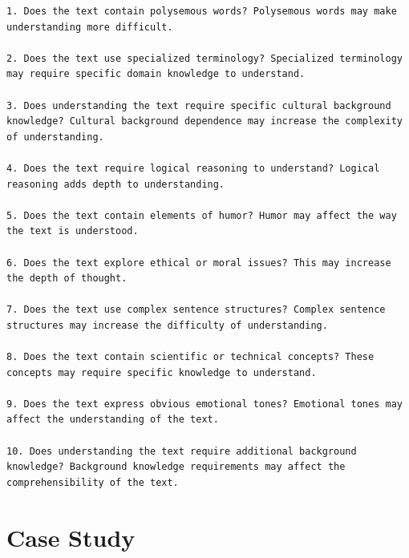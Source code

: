 \documentclass[11pt]{article}
\begin{document}
\begin{tcolorbox}[colback=white!95!gray,colframe=gray!50!black,rounded corners,label={prompt-dot2}, title={Rules for Property Recognition}]
\begin{lstlisting}[breaklines=true, xleftmargin=0pt, breakindent=0pt, columns=fullflexible, mathescape, numbers=none]
1. Does the text contain polysemous words? Polysemous words may make understanding more difficult.

2. Does the text use specialized terminology? Specialized terminology may require specific domain knowledge to understand.

3. Does understanding the text require specific cultural background knowledge? Cultural background dependence may increase the complexity of understanding.

4. Does the text require logical reasoning to understand? Logical reasoning adds depth to understanding.

5. Does the text contain elements of humor? Humor may affect the way the text is understood.

6. Does the text explore ethical or moral issues? This may increase the depth of thought.

7. Does the text use complex sentence structures? Complex sentence structures may increase the difficulty of understanding.

8. Does the text contain scientific or technical concepts? These concepts may require specific knowledge to understand.

9. Does the text express obvious emotional tones? Emotional tones may affect the understanding of the text.

10. Does understanding the text require additional background knowledge? Background knowledge requirements may affect the comprehensibility of the text.
\end{lstlisting}
\end{tcolorbox}
\twocolumn


\onecolumn
\section{Case Study}

\end{document}
